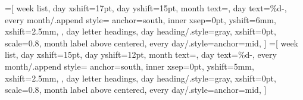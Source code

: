 \ifwall
  =[
    week list,
    day xshift=17pt,
    day yshift=15pt,
    month text={\plannerPortraitMonthFmt\@tr@monthNumName{\pgfcalendarcurrentmonth}},
    day text={\plannerPortraitDayFmt\%d-},
    every month/.append style={%
      anchor=south,
      inner xsep=0pt,
      yshift=6mm,
      xshift=2.5mm,
    },
    day letter headings,
    day heading/.style={gray, xshift=0pt, scale=0.8},
    month label above centered,
    every day/.style={anchor=mid},
  ]
\else
  =[
    week list,
    day xshift=15pt,
    day yshift=12pt,
    month text={\plannerPortraitMonthFmt\@tr@monthNumName{\pgfcalendarcurrentmonth}},
    day text={\plannerPortraitDayFmt\%d-},
    every month/.append style={%
      anchor=south,
      inner xsep=0pt,
      yshift=5mm,
      xshift=2.5mm,
    },
    day letter headings,
    day heading/.style={gray, xshift=0pt, scale=0.8},
    month label above centered,
    every day/.style={anchor=mid},
  ]
\fi

\newcommand*\parseYearEventsAsThreeColsTable[1][]{%
\pgfkeys{/parseYearEvents, defaults, #1,
  year/.get=\@t@year,
  filter pred/.get=\@t@filterPred,
  events csv/.get=\@t@eventsCsv,
}%
\luadirect{
require("../../scripts/helpers.lua")
yearEventsAsThreeColsTable(
  tonumber(\@t@year),
  \@t@filterPred,
  \luastring{\@t@eventsCsv}
)}}

\renewcommand\plannerEvents{%
\hspace*{-\@wall@leftMargin}%
\begin{minipage}{\calPaperWidth}%
\centering
\fontsize{9}{12}\selectfont%
\parseYearEventsAsThreeColsTable[filter pred = hasFootnote]%
\par%
\end{minipage}}

\newcommand\YearPlannerPortraitPage{%
\newpage
\ifvarnishmask
\mbox{}
\else
\preYearPlannerPageHook

\vspace*{\plannerTopSkip}%

{\centering

{\printPlannerTitle}

\vspace*{\plannerTitleSep}

\YearPlannerPortrait

\vspace*{\plannerNotesSep}

\plannerEvents

}

\fi
}

